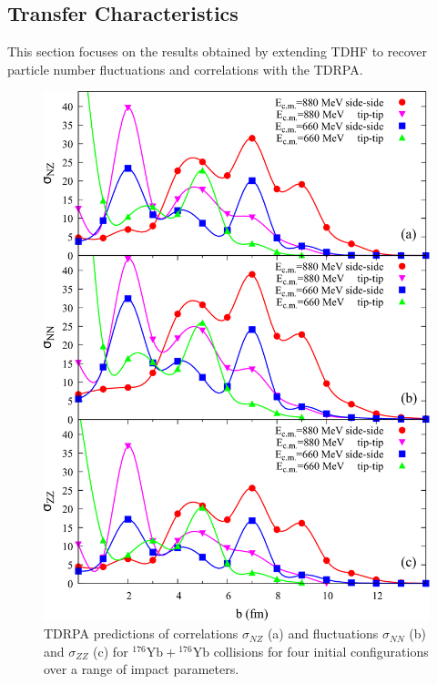 \subsection{Transfer Characteristics}\label{sec:tran}

This section focuses on the results obtained by extending TDHF to recover particle number fluctuations and correlations with the TDRPA.

\begin{figure}
	\includegraphics*[width=\textwidth]{../Figures/YbYb/Fluctuations.pdf}
	\caption{TDRPA predictions of correlations $\sigma_{NZ}$ (a) and fluctuations $\sigma_{NN}$ (b) and $\sigma_{ZZ}$ (c) for $^{176}\mathrm{Yb}+{}^{176}\mathrm{Yb}$ collisions for four initial configurations over a range of impact parameters.}
	\label{fig:fluc}
\end{figure}


